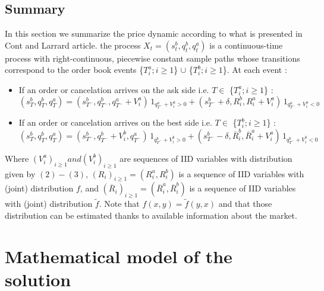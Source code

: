 \documentclass{article}
\begin{document}
\subsection{Summary}
In this section we summarize the price dynamic according to what is presented in Cont and Larrard article.
the process $X_{t} = (s_{t}^{b}, q_{t}^{b}, q_{t}^{a})$ is a continuous-time process with right-continuous, piecewise
constant sample paths whose transitions correspond to the order book events \{$T_{i}^{a} ; i \geq 1$\} $\cup$ \{$T_{i}^{b} ; i \geq 1$\}. At each event :
\begin{itemize}
\item If an order or cancelation arrives on the ask side i.e. $T \in $ \{$T_{i}^{a} ; i \geq 1$\} :
\begin{equation}
(s_{T}^{b}, q_{T}^{b}, q_{T}^{a}) = (s_{T^{-}}^{b}, q_{T^{-}}^{b}, q_{T^{-}}^{a}+V_{i}^{a}) \, 1_{q_{T^{-}}^{a}+V_{i}^{a}>0} + (s_{T^{-}}^{b}+ \delta, R_{i}^{b}, R_{i}^{a}+V_{i}^{a}) \, 1_{q_{T^{-}}^{a}+V_{i}^{a}<0}
\end{equation}

\item If an order or cancelation arrives on the best side i.e. $T \in $ \{$T_{i}^{b} ; i \geq 1$\} :
\begin{equation}
(s_{T}^{b}, q_{T}^{b}, q_{T}^{a}) = (s_{T^{-}}^{b}, q_{T^{-}}^{b}+V_{i}^{b}, q_{T^{-}}^{a}) \, 1_{q_{T^{-}}^{b}+V_{i}^{b}>0} + (s_{T^{-}}^{b}- \delta, \overline{R}_{i}^{b}, \overline{R}_{i}^{a}+V_{i}^{a}) \, 1_{q_{T^{-}}^{b}+V_{i}^{b}<0}
\end{equation}
\end{itemize}
Where $(V^{a}_{i})_{i \geq 1} and (V^{b}_{i})_{i \geq 1}$ are sequences of IID variables with distribution given by $(2)-(3)$, $(R_{i})_{i \geq 1} = (R^{a}_{i},R^{b}_{i})$ is a sequence of IID variables with (joint) distribution $f$, and $(\overline{R}_{i})_{i \geq 1} = (\overline{R}^{a}_{i},\overline{R}^{b}_{i})$ is a sequence of IID variables with (joint) distribution $\tilde{f}$.
Note that $f(x,y) = \tilde{f}(y,x)$ and that those distribution can be estimated thanks to available information about the market.




\newpage
\section{Mathematical model of the solution}
\end{document}
